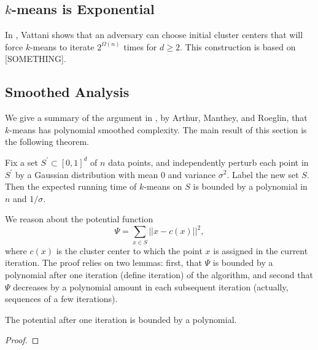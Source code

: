 \subsection{$k$-means is Exponential}
In \cite{KMworstcase}, Vattani shows that an adversary can choose
initial cluster centers that will force $k$-means to iterate
$2^{\Omega(n)}$ times for $d \ge 2$. This construction is based on
[SOMETHING].

\subsection{Smoothed Analysis}
We give a summary of the argument in \cite{SAkmeans}, by Arthur,
Manthey, and Roeglin, that $k$-means has polynomial smoothed
complexity. The main result of this section is the following theorem.
\begin{theorem}
Fix a set $S^{\prime} \subset [0,1]^d$ of $n$ data points, and
independently perturb each point in $S^{\prime}$ by a Gaussian
distribution with mean 0 and variance $\sigma^2$. Label the new set
$S$. Then the expected running time of $k$-means on $S$ is bounded by
a polynomial in $n$ and $1/\sigma$.
\end{theorem}
We reason about the potential function \begin{equation}
\Psi = \sum_{x \in S}||x - c(x)||^2,
\end{equation} 
where $c(x)$ is the cluster center to which the point $x$ is assigned
in the current iteration. The proof relies on two lemmas: first, that
$\Psi$ is bounded by a polynomial after one iteration (define
iteration) of the algorithm, and second that $\Psi$ decreases by a
polynomial amount in each subsequent iteration (actually, sequences of
a few iterations).

\begin{lemma}
The potential after one iteration is bounded by a polynomial.
\end{lemma}
\begin{proof}
\end{proof}
